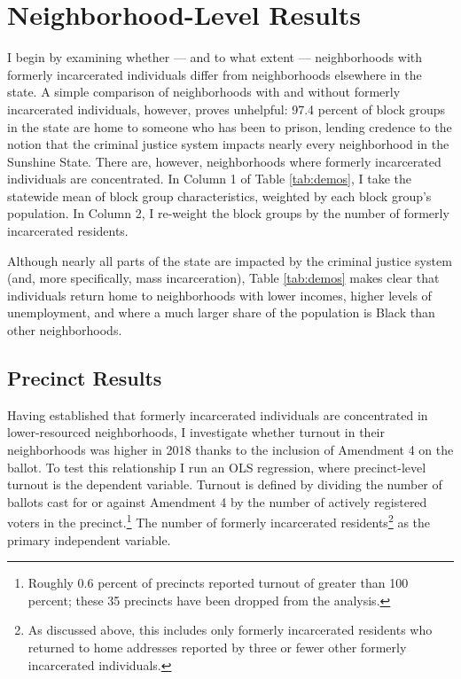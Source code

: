 \documentclass[
  12pt,
]{article}
\begin{document}
\hypertarget{neighborhood-level-results}{%
\section*{Neighborhood-Level Results}\label{neighborhood-level-results}}

I begin by examining whether --- and to what extent --- neighborhoods with formerly incarcerated individuals differ from neighborhoods elsewhere in the state. A simple comparison of neighborhoods with and without formerly incarcerated individuals, however, proves unhelpful: 97.4 percent of block groups in the state are home to someone who has been to prison, lending credence to the notion that the criminal justice system impacts nearly every neighborhood in the Sunshine State. There are, however, neighborhoods where formerly incarcerated individuals are concentrated. In Column 1 of Table \ref{tab:demos}, I take the statewide mean of block group characteristics, weighted by each block group's population. In Column 2, I re-weight the block groups by the number of formerly incarcerated residents.



Although nearly all parts of the state are impacted by the criminal justice system (and, more specifically, mass incarceration), Table \ref{tab:demos} makes clear that individuals return home to neighborhoods with lower incomes, higher levels of unemployment, and where a much larger share of the population is Black than other neighborhoods.

\hypertarget{precinct-results}{%
\subsection{Precinct Results}\label{precinct-results}}

Having established that formerly incarcerated individuals are concentrated in lower-resourced neighborhoods, I investigate whether turnout in their neighborhoods was higher in 2018 thanks to the inclusion of Amendment 4 on the ballot. To test this relationship I run an OLS regression, where precinct-level turnout is the dependent variable. Turnout is defined by dividing the number of ballots cast for or against Amendment 4 by the number of actively registered voters in the precinct.\footnote{Roughly 0.6 percent of precincts reported turnout of greater than 100 percent; these 35 precincts have been dropped from the analysis.} The number of formerly incarcerated residents\footnote{As discussed above, this includes only formerly incarcerated residents who returned to home addresses reported by three or fewer other formerly incarcerated individuals.} as the primary independent variable.
\end{document}
